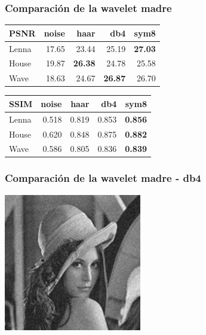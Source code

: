 \documentclass{beamer}
\begin{document}
  \begin{frame}
    \frametitle{Comparación de la wavelet madre}
    \centering
    \begin{tabular}{lrrrr}
      \toprule
      {PSNR} &  noise &   haar &    db4 &   sym8 \\
      \midrule
      Lenna &  17.65 &  23.44 & 25.19 &  \bf{27.03} \\
      House &  19.87 &  \bf{26.38} &  24.78 &  25.58 \\
      Wave &  18.63 &  24.67 &  \bf{26.87} &  26.70 \\
      \bottomrule
      \end{tabular}
  
      \begin{tabular}{lrrrr}
        {SSIM} &  noise &   haar &    db4 &   sym8 \\
        \midrule
        Lenna &  0.518 &  0.819 &  0.853 &  \bf{0.856} \\
        House &  0.620 &  0.848 &  0.875 &  \bf{0.882} \\
        Wave &  0.586 &  0.805 &  0.836 &  \bf{0.839} \\
        \bottomrule
        \end{tabular}
  \end{frame}

  \begin{frame}
    \frametitle{Comparación de la wavelet madre - db4}
    
    \centering
    \includegraphics[width=6cm]{imgs/Wavelets/2_normal_soft_db4_Lenna.jpg}
   
  
  \end{frame}
\end{document}
